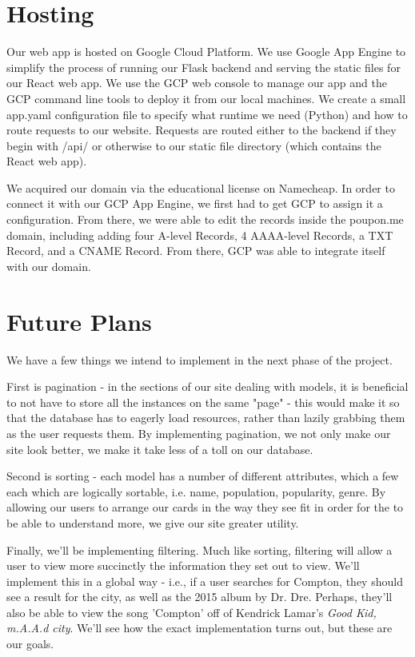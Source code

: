 \documentclass{scrartcl}
\begin{document}
    \section{Hosting}\label{sec:hosting}
    Our web app is hosted on Google Cloud Platform.
    We use Google App Engine to simplify the process of running our Flask backend and serving the static files for our React web app.
    We use the GCP web console to manage our app and the GCP command line tools to deploy it from our local machines.
    We create a small app.yaml configuration file to specify what runtime we need (Python) and how to route requests to our website.
    Requests are routed either to the backend if they begin with /api/ or otherwise to our static file directory (which contains the React web app).

    We acquired our domain via the educational license on Namecheap.
    In order to connect it with our GCP App Engine, we first had to get GCP to assign it a configuration.
    From there, we were able to edit the records inside the poupon.me domain, including adding four A-level Records, 4 AAAA-level Records, a TXT Record, and a CNAME Record.
    From there, GCP was able to integrate itself with our domain.

    \section{Future Plans}\label{sec:futurePlans}
    We have a few things we intend to implement in the next phase of the project.

    First is pagination - in the sections of our site dealing with models, it is beneficial to not have to store all the instances on the same "page" - this would make it so that the database has to eagerly load resources, rather than lazily grabbing them as the user requests them.
    By implementing pagination, we not only make our site look better, we make it take less of a toll on our database.

    Second is sorting - each model has a number of different attributes, which a few each which are logically sortable, i.e. name, population, popularity, genre.
    By allowing our users to arrange our cards in the way they see fit in order for the to be able to understand more, we give our site greater utility.

    Finally, we'll be implementing filtering.
    Much like sorting, filtering will allow a user to view more succinctly the information they set out to view.
    We'll implement this in a global way - i.e., if a user searches for Compton, they should see a result for the city, as well as the 2015 album by Dr.
        Dre.
        Perhaps, they'll also be able to view the song 'Compton' off of Kendrick Lamar's \textit{Good Kid, m.A.A.d city}.
    We'll see how the exact implementation turns out, but these are our goals.
\end{document}
